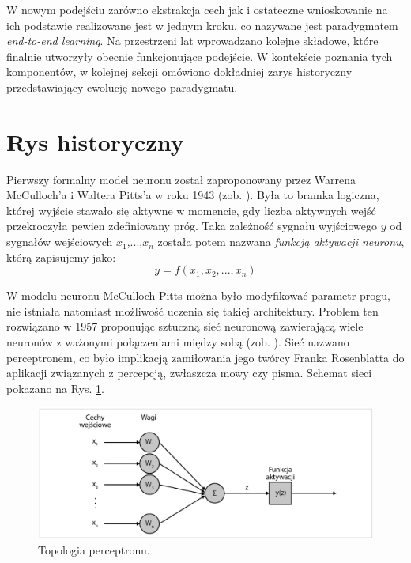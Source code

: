 W nowym podejściu zarówno ekstrakcja cech jak i ostateczne wnioskowanie na ich podstawie realizowane jest w jednym kroku, co nazywane jest paradygmatem \textit{end-to-end learning}. Na przestrzeni lat wprowadzano kolejne składowe, które finalnie utworzyły obecnie funkcjonujące podejście. W kontekście poznania tych komponentów, w kolejnej sekcji omówiono dokładniej zarys historyczny przedstawiający ewolucję nowego paradygmatu. 

\section{Rys historyczny}

Pierwszy formalny model neuronu został zaproponowany przez Warrena McCulloch'a i Waltera Pitts'a w roku 1943 (zob. \cite{McCulloch1943}). Była to bramka logiczna, której wyjście stawało się aktywne w momencie, gdy liczba aktywnych wejść przekroczyła pewien zdefiniowany próg. Taka zależność sygnału wyjściowego $y$ od sygnałów wejściowych $x_1$,...,$x_n$ została potem nazwana \textit{funkcją aktywacji neuronu}, którą zapisujemy jako:
\begin{equation}
\label{eqActFunc}
y=f\left(x_1, x_2,..., x_n\right)
\end{equation}

W modelu neuronu McCulloch-Pitts można było modyfikować parametr progu, nie istniała natomiast możliwość uczenia się takiej architektury. Problem ten rozwiązano w 1957 proponując sztuczną sieć neuronową zawierającą wiele neuronów z ważonymi połączeniami między sobą (zob. \cite{Rosenblatt1957}). Sieć nazwano perceptronem, co było implikacją zamiłowania jego twórcy Franka Rosenblatta do aplikacji związanych z percepcją, zwłaszcza mowy czy pisma. Schemat sieci pokazano na Rys. \ref{Perceptron}.
\begin{figure}[h!]
	\centering
	\includegraphics[width=1\textwidth]{figures/perceptron.png}
	\caption{Topologia perceptronu.}
	\label{Perceptron}
\end{figure}

